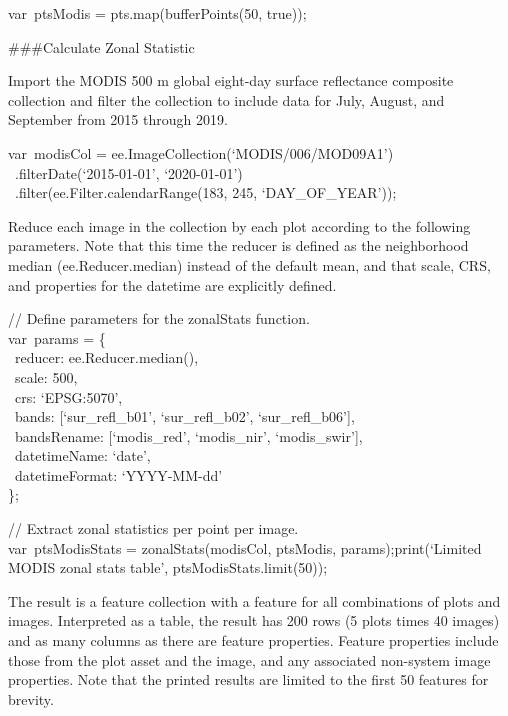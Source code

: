 \documentclass[
  letterpaper,
  DIV=11,
  numbers=noendperiod]{scrreprt}
\begin{document}
var~ptsModis = pts.map(bufferPoints(50, true));

\#\#\#Calculate Zonal Statistic

Import the MODIS 500 m global eight-day surface reflectance composite
collection and filter the collection to include data for July, August,
and September from 2015 through 2019.

var~modisCol = ee.ImageCollection(`MODIS/006/MOD09A1')\\
\hspace*{0.333em} ~.filterDate(`2015-01-01', `2020-01-01')\\
\hspace*{0.333em} ~.filter(ee.Filter.calendarRange(183, 245,
`DAY\_OF\_YEAR'));

Reduce each image in the collection by each plot according to the
following parameters. Note that this time the reducer is defined as the
neighborhood median (ee.Reducer.median) instead of the default mean, and
that scale, CRS, and properties for the datetime are explicitly defined.

// Define parameters for the zonalStats function.\\
var~params = \{\\
\hspace*{0.333em} ~reducer: ee.Reducer.median(),\\
\hspace*{0.333em} ~scale: 500,\\
\hspace*{0.333em} ~crs: `EPSG:5070',\\
\hspace*{0.333em} ~bands: {[}`sur\_refl\_b01', `sur\_refl\_b02',
`sur\_refl\_b06'{]},\\
\hspace*{0.333em} ~bandsRename: {[}`modis\_red', `modis\_nir',
`modis\_swir'{]},\\
\hspace*{0.333em} ~datetimeName: `date',\\
\hspace*{0.333em} ~datetimeFormat: `YYYY-MM-dd'\\
\};

// Extract zonal statistics per point per image.\\
var~ptsModisStats = zonalStats(modisCol, ptsModis,
params);print(`Limited MODIS zonal stats table',
ptsModisStats.limit(50));

The result is a feature collection with a feature for all combinations
of plots and images. Interpreted as a table, the result has 200 rows (5
plots times 40 images) and as many columns as there are feature
properties. Feature properties include those from the plot asset and the
image, and any associated non-system image properties. Note that the
printed results are limited to the first 50 features for brevity.
\end{document}
